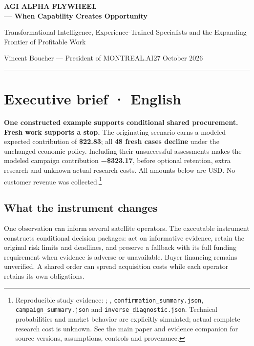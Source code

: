 \documentclass[10pt,letterpaper]{article}
\begin{document}
{\sffamily\fontsize{17}{20}\selectfont\bfseries\color{navy}AGI ALPHA FLYWHEEL\\— When Capability Creates Opportunity\par}
{\sffamily\normalsize\color{teal}Transformational Intelligence,
Experience-Trained Specialists and the Expanding Frontier of Profitable
Work\par}
{\normalsize Vincent Boucher --- President of
MONTREAL.AI\hfill 27 October 2026\par}
\vspace{0.3cm}\hrule\vspace{0.3cm}
\hypertarget{executive-brief-english}{%
\section{Executive brief · English}\label{executive-brief-english}}

\textbf{One constructed example supports conditional shared procurement.
Fresh work supports a stop.} The originating scenario earns a modeled
expected contribution of \textbf{\$22.83}; all \textbf{48 fresh cases
decline} under the unchanged economic policy. Including their
unsuccessful assessments makes the modeled campaign contribution
\textbf{−\$323.17}, before optional retention, extra research and
unknown actual research costs. All amounts below are USD. No customer
revenue was collected.\footnote{Reproducible study evidence:
  ; ,
  \texttt{confirmation\_summary.json}, \texttt{campaign\_summary.json}
  and \texttt{inverse\_diagnostic.json}. Technical probabilities and
  market behavior are explicitly simulated; actual complete research
  cost is unknown. See the main paper and evidence companion for source
  versions, assumptions, controls and provenance.}

\hypertarget{what-the-instrument-changes}{%
\subsection{What the instrument
changes}\label{what-the-instrument-changes}}

One observation can inform several satellite operators. The executable
instrument constructs conditional decision packages: act on informative
evidence, retain the original risk limits and deadlines, and preserve a
fallback with its full funding requirement when evidence is adverse or
unavailable. Buyer financing remains unverified. A shared order can
spread acquisition costs while each operator retains its own
obligations.
\end{document}
